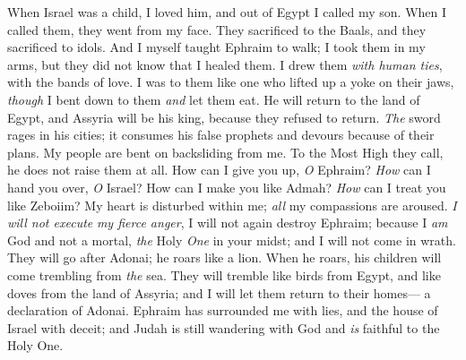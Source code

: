 \begin{biblechapter} %
 When Israel was a child, I loved him, 
and out of Egypt I called my son.
\verse When I called them, they went from my face. 
They sacrificed to the Baals, and they sacrificed to idols.
\verse And I myself taught Ephraim to walk; 
I took them in my arms, 
but they did not know that I healed them.
\verse I drew them \textit{with human ties}, 
with the bands of love. 
I was to them like one who lifted up a yoke on their jaws, 
\textit{though} I bent down to them \textit{and} let them eat.
\verse He will return to the land of Egypt, 
and Assyria will be his king, 
because they refused to return.
\verse \textit{The} sword rages in his cities; 
it consumes his false prophets 
and devours because of their plans.
\verse My people are bent on backsliding from me. 
To the Most High they call, 
he does not raise them at all.
\verse How can I give you up, \textit{O} Ephraim? 
\textit{How} can I hand you over, \textit{O} Israel? 
How can I make you like Admah? 
\textit{How} can I treat you like Zeboiim? 
My heart is disturbed within me; 
\textit{all} my compassions are aroused.
\verse \textit{I will not execute} \textit{my fierce anger}, 
I will not again destroy Ephraim; 
because I \textit{am} God 
and not a mortal, 
\textit{the} Holy \textit{One} in your midst; 
and I will not come in wrath.
\verse They will go after Adonai; 
he roars like a lion. 
When he roars, 
his children will come trembling 
from \textit{the} sea.
\verse They will tremble like birds from Egypt, 
and like doves from the land of Assyria; 
and I will let them return to their homes— 
a declaration of Adonai.
  Ephraim has surrounded me with lies, 
and the house of Israel with deceit; 
and Judah is still wandering with God 
and \textit{is} faithful to the Holy One.
\end{biblechapter}

